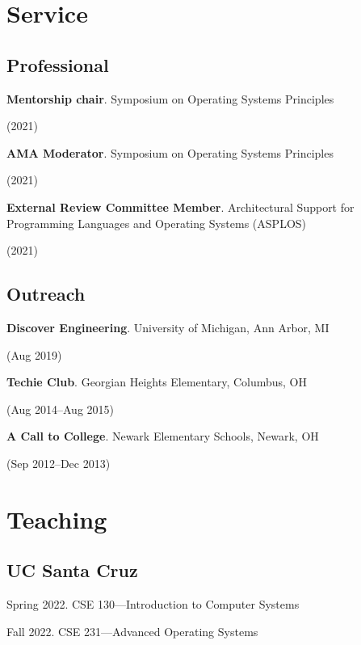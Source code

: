 \documentclass[letterpaper,10pt]{article}
\newcommand{\sidebyside}[2]{
  \begin{minipage}[t]{.75\textwidth}
    \raggedright{}
    #2
  \end{minipage}
  \hspace{.01\textwidth}
    \begin{minipage}[t]{.205\textwidth}
    \raggedleft
    #1
  \end{minipage}
}
\newcommand{\trio}[3]{\sidebyside{#3}{\textbf{#1}. #2}}
\begin{document}
\section{Service}
\subsection{Professional}
\begin{smenumerate}
\item\trio{Mentorship chair}{Symposium on Operating Systems Principles}{(2021)}
\item\trio{AMA Moderator}{Symposium on Operating Systems Principles}{(2021)}
\item\trio{External Review Committee Member}{Architectural Support for
  Programming Languages and Operating Systems (ASPLOS)}{(2021)}
\end{smenumerate}

\subsection{Outreach}
\begin{smenumerate}
\item\trio{Discover Engineering}{University of Michigan, Ann Arbor, MI}{(Aug 2019)}
\item\trio{Techie Club}{Georgian Heights Elementary, Columbus, OH}{(Aug 2014--Aug 2015)}
\item\trio{A Call to College}{Newark Elementary Schools, Newark, OH}{(Sep 2012--Dec 2013)}
\end{smenumerate}



\section{Teaching}
\subsection{UC Santa Cruz}
\begin{smenumerate}
  \item Spring 2022. CSE 130---Introduction to Computer Systems
  \item Fall 2022. CSE 231---Advanced Operating Systems
  
\end{smenumerate}
\end{document}
